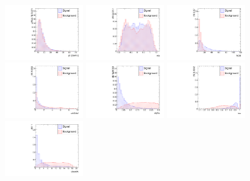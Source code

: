 \begin{figure}
  \centering
  \includegraphics[width=0.3\textwidth]{Figures/pt_barrel}
  \includegraphics[width=0.3\textwidth]{Figures/eta_barrel}
  \includegraphics[width=0.3\textwidth]{Figures/fls3d_barrel}
  \includegraphics[width=0.3\textwidth]{Figures/chi2dof_barrel}
  \includegraphics[width=0.3\textwidth]{Figures/alpha_barrel}
  \includegraphics[width=0.3\textwidth]{Figures/iso_barrel}
  \includegraphics[width=0.3\textwidth]{Figures/closetrk_barrel}

\end{figure}
